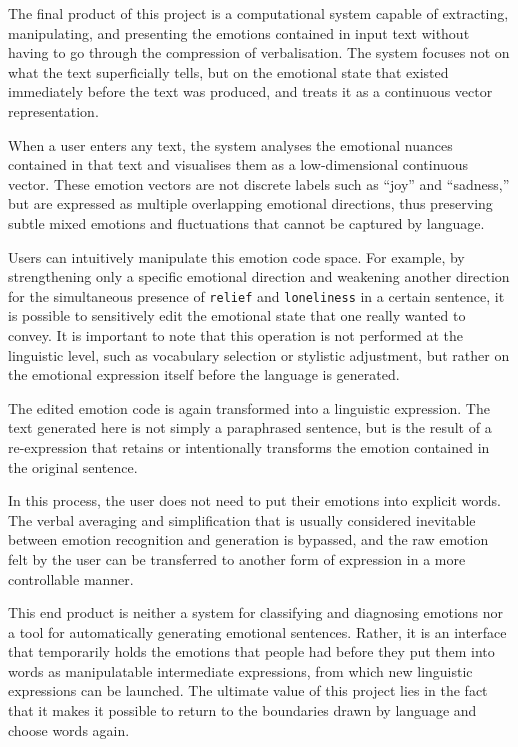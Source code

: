 \documentclass[12pt,twoside]{report}
\begin{document}
The final product of this project is a computational system capable of extracting, manipulating, and presenting the emotions contained in input text without having to go through the compression of verbalisation.
The system focuses not on what the text superficially tells, but on the emotional state that existed immediately before the text was produced, and treats it as a continuous vector representation.

When a user enters any text, the system analyses the emotional nuances contained in that text and visualises them as a low-dimensional continuous vector. These emotion vectors are not discrete labels such as ``joy'' and ``sadness,'' but are expressed as multiple overlapping emotional directions, thus preserving subtle mixed emotions and fluctuations that cannot be captured by language.

Users can intuitively manipulate this emotion code space. For example, by strengthening only a specific emotional direction and weakening another direction for the simultaneous presence of \texttt{relief} and \texttt{loneliness} in a certain sentence, it is possible to sensitively edit the emotional state that one really wanted to convey. It is important to note that this operation is not performed at the linguistic level, such as vocabulary selection or stylistic adjustment, but rather on the emotional expression itself before the language is generated.

The edited emotion code is again transformed into a linguistic expression. The text generated here is not simply a paraphrased sentence, but is the result of a re-expression that retains or intentionally transforms the emotion contained in the original sentence.

In this process, the user does not need to put their emotions into explicit words. The verbal averaging and simplification that is usually considered inevitable between emotion recognition and generation is bypassed, and the raw emotion felt by the user can be transferred to another form of expression in a more controllable manner.

This end product is neither a system for classifying and diagnosing emotions nor a tool for automatically generating emotional sentences. Rather, it is an interface that temporarily holds the emotions that people had before they put them into words as manipulatable intermediate expressions, from which new linguistic expressions can be launched. The ultimate value of this project lies in the fact that it makes it possible to return to the boundaries drawn by language and choose words again.
\end{document}
